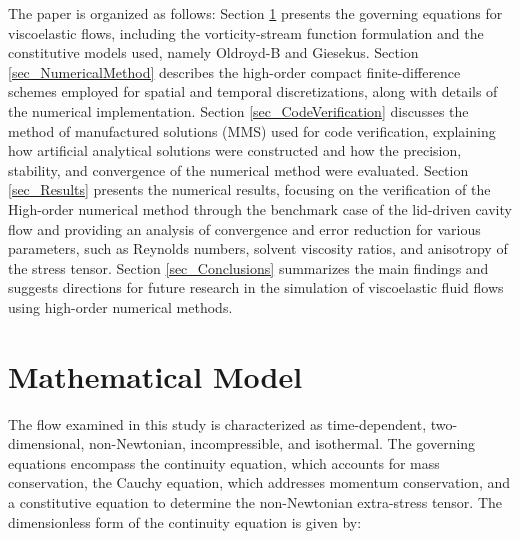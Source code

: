\documentclass[preprint, 12pt]{elsarticle}
\begin{document}
The paper is organized as follows: Section \ref{sec_MathematicalModel} presents
the governing equations for viscoelastic flows, including the vorticity-stream
function formulation and the constitutive models used, namely Oldroyd-B and
Giesekus. Section \ref{sec_NumericalMethod} describes the high-order compact
finite-difference schemes employed for spatial and temporal discretizations,
along with details of the numerical implementation. Section
\ref{sec_CodeVerification} discusses the method of manufactured solutions (MMS)
used for code verification, explaining how artificial analytical solutions were
constructed and how the precision, stability, and convergence of the numerical
method were evaluated. Section \ref{sec_Results} presents the numerical
results, focusing on the verification of the High-order numerical method
through the benchmark case of the lid-driven cavity flow and providing an
analysis of convergence and error reduction for various parameters, such as
Reynolds numbers, solvent viscosity ratios, and anisotropy of the stress
tensor. Section \ref{sec_Conclusions} summarizes the main findings and suggests
directions for future research in the simulation of viscoelastic fluid flows
using high-order numerical methods.

\section{Mathematical Model}\label{sec_MathematicalModel}
\unskip

The flow examined in this study is characterized as time-dependent,
two-dimensional, non-Newtonian, incompressible, and isothermal. The governing
equations encompass the continuity equation, which accounts for mass
conservation, the Cauchy equation, which addresses momentum conservation, and a
constitutive equation to determine the non-Newtonian extra-stress tensor. The
dimensionless form of the continuity equation is given by:
\end{document}

